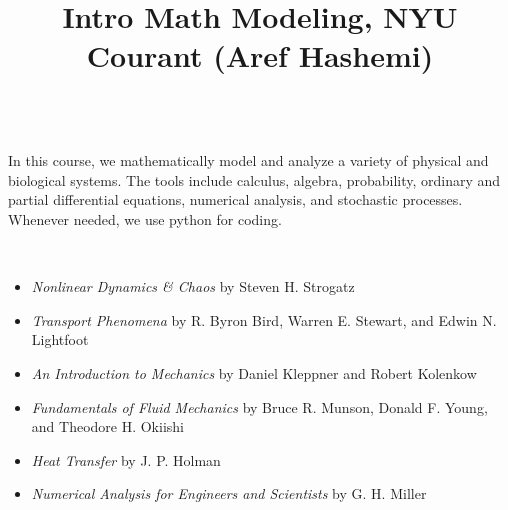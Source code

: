 \documentclass[amsmath,amsfonts,amssymb,letterpaper,10pt]{article}
\title{\vspace{-1cm}\Large{\textbf{Intro Math Modeling, NYU Courant (Aref Hashemi)}}}
\author{}
\date{}
\begin{document}
\maketitle

\vspace{-1cm}
\\
In this course, we mathematically model and analyze a variety of physical and biological systems. The tools include calculus, algebra, probability, ordinary and partial differential equations, numerical analysis, and stochastic processes. Whenever needed, we use python for coding.

\vspace{0.25cm}
\\
\vspace{-0.5cm}
\begin{itemize}[leftmargin=*]\setlength\itemsep{-0.3em}
\item \emph{Nonlinear Dynamics \& Chaos} by Steven H. Strogatz
\item \emph{Transport Phenomena} by R. Byron Bird, Warren E. Stewart, and Edwin N. Lightfoot
\item \emph{An Introduction to Mechanics} by Daniel Kleppner and Robert Kolenkow
\item \emph{Fundamentals of Fluid Mechanics} by Bruce R. Munson, Donald F. Young, and Theodore H. Okiishi
\item \emph{Heat Transfer} by J. P. Holman
\item \emph{Numerical Analysis for Engineers and Scientists} by G. H. Miller
\end{itemize}
\end{document}
